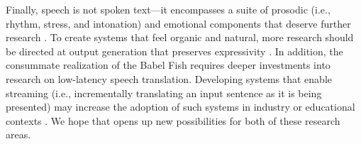 Finally, speech is not spoken text—it encompasses a suite of prosodic (i.e., rhythm, stress, and intonation) and emotional components that deserve further research \citep{elbow1985shifting}. To create \sst{} systems that feel  organic and natural, more research should be directed at output generation that preserves expressivity \citep{trilla2012sentence}. In addition, the consummate realization of the Babel Fish requires deeper investments into research on low-latency speech translation. Developing systems that enable streaming (i.e., incrementally translating an input sentence as it is being presented) may increase the adoption of such systems in industry or educational contexts \citep{iranzo2022simultaneous,rybakov2022streaming}. We hope that \mfourt opens up new possibilities for both of these research areas. 


